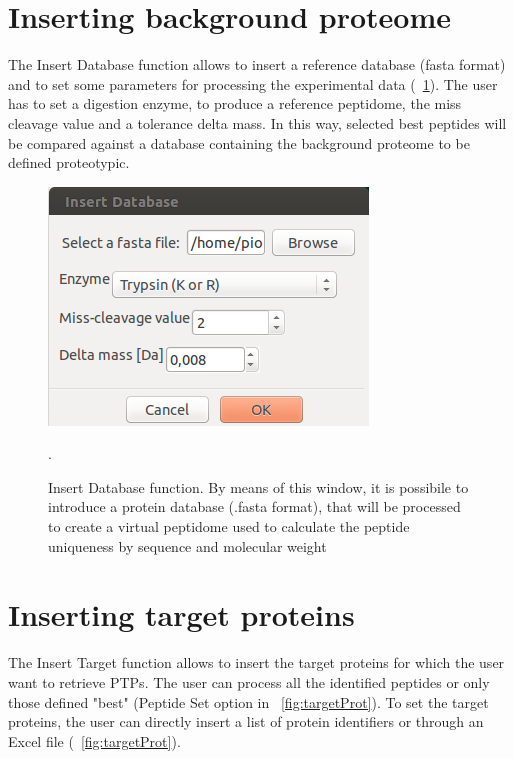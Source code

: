 \documentclass[a4paper,14pt]{extarticle}
\begin{document}
\section{Inserting background proteome}


The Insert Database function allows to insert a reference database (fasta format) and to set some parameters for processing the experimental data (\figurename~\ref{fig:database}). The user has to set a digestion enzyme, to produce a reference peptidome, the miss cleavage value and a tolerance delta mass. In this way, selected best peptides will be compared against a database containing the background proteome to be defined proteotypic.
 
\begin{figure}[htbp]
\begin{center}
\includegraphics[scale=0.8]{EPPI_insert_database}
\caption{Insert Database function. By means of this window, it is possibile to introduce a protein database (.fasta format), that will be processed to create a virtual peptidome used to calculate the peptide uniqueness by sequence and molecular weight}.\label{fig:database}
\end{center}
\end{figure}

\section{Inserting target proteins}

The Insert Target function allows to insert the target proteins for which the user want to retrieve PTPs. The user can process all the identified peptides or only those defined "best" (Peptide Set option in \figurename~\ref{fig:targetProt}). To set the target proteins, the user can directly insert a list of protein identifiers or through an Excel file (\figurename~\ref{fig:targetProt}).
\end{document}
